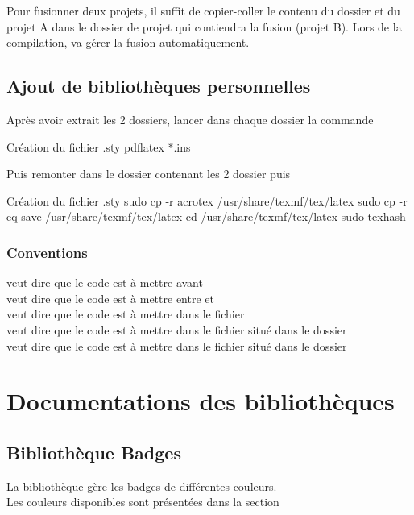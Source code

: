 {Pour fusionner deux projets, il suffit de copier-coller le contenu du dossier  et  du projet A 
dans le dossier de projet qui contiendra la fusion (projet B). Lors de la compilation,  va gérer la 
fusion automatiquement.


\chapter{Ajout de bibliothèques personnelles}


Après avoir extrait les 2 dossiers, lancer dans chaque dossier la commande
\begin{Bash}{Création du fichier .sty}
pdflatex *.ins
\end{Bash}

Puis remonter dans le dossier contenant les 2 dossier puis
\begin{Bash}{Création du fichier .sty}
sudo cp -r acrotex /usr/share/texmf/tex/latex
sudo cp -r eq-save /usr/share/texmf/tex/latex
cd /usr/share/texmf/tex/latex
sudo texhash
\end{Bash}
    \section{Conventions}

 veut dire que le code est à mettre avant \\
 veut dire que le code est à mettre entre  et \\
 veut dire que le code est à mettre dans le fichier \\
 veut dire que le code est à mettre dans le fichier  situé dans le dossier \\
 veut dire que le code est à mettre dans le fichier  situé dans le dossier \\\part{Documentations des bibliothèques}

\chapter{Bibliothèque Badges}

La bibliothèque  gère les badges de différentes couleurs. \\Les couleurs disponibles sont présentées dans la section 

}
